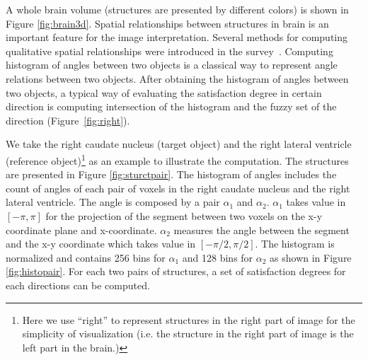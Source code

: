 \documentclass{article}
\begin{document}
A whole brain volume (structures are presented by different colors) is  shown in Figure \ref{fig:brain3d}.
Spatial relationships between structures in brain is an important feature for the image interpretation. 
Several methods for computing qualitative spatial relationships were introduced in the survey~\cite{Bloch2005fuzzy}.
Computing histogram of angles between two objects is a classical way to represent angle relations between two objects.
After obtaining the histogram of angles between two objects, a typical way of evaluating the satisfaction degree in certain
direction is computing intersection of the histogram and the fuzzy set of the direction (Figure~\ref{fig:right}).

We take the right caudate nucleus (target object) and the right lateral ventricle (reference object)\footnote{Here we use ``right'' to represent 
structures in the right part of image for the simplicity of visualization (i.e. the structure in the right part of image is the left part in the brain.)} as an example to illustrate the computation.
The structures are presented in Figure \ref{fig:sturctpair}.
The histogram of angles includes the count of angles of each pair of voxels in the right caudate nucleus and the right lateral ventricle.
The angle is composed by a pair $\alpha_1$ and $\alpha_2$. 
$\alpha_1$ takes value in $[-\pi, \pi]$ for the projection of the segment between two voxels on the x-y coordinate plane and x-coordinate.
$\alpha_2$ measures the angle between the segment and the x-y coordinate which takes value in $[-\pi/2, \pi/2]$.
The histogram is normalized and contains 256 bins for $\alpha_1$ and 128 bins for $\alpha_2$ as shown in Figure \ref{fig:histopair}.
For each two pairs of structures, a set of satisfaction degrees for each directions can be computed.
\end{document}
